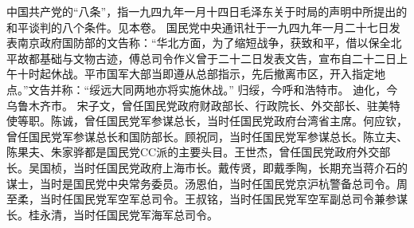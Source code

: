 \begin{maonote}
中国共产党的“八条”，指一九四九年一月十四日毛泽东关于时局的声明中所提出的和平谈判的八个条件。见本卷。
国民党中央通讯社于一九四九年一月二十七日发表南京政府国防部的文告称：“华北方面，为了缩短战争，获致和平，借以保全北平故都基础与文物古迹，傅总司令作义曾于二十二日发表文告，宣布自二十二日上午十时起休战。平市国军大部当即遵从总部指示，先后撤离市区，开入指定地点。”文告并称：“绥远大同两地亦将实施休战。”
归绥，今呼和浩特市。
迪化，今乌鲁木齐市。
宋子文，曾任国民党政府财政部长、行政院长、外交部长、驻美特使等职。陈诚，曾任国民党军参谋总长，当时任国民党政府台湾省主席。何应钦，曾任国民党军参谋总长和国防部长。顾祝同，当时任国民党军参谋总长。陈立夫、陈果夫、朱家骅都是国民党CC派的主要头目。王世杰，曾任国民党政府外交部长。吴国桢，当时任国民党政府上海市长。戴传贤，即戴季陶，长期充当蒋介石的谋士，当时是国民党中央常务委员。汤恩伯，当时任国民党京沪杭警备总司令。周至柔，当时任国民党军空军总司令。王叔铭，当时任国民党军空军副总司令兼参谋长。桂永清，当时任国民党军海军总司令。
\end{maonote}
